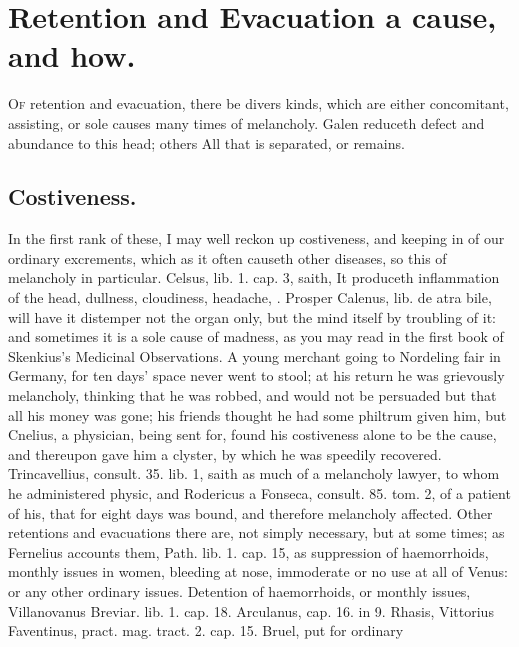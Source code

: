 {%
\section{Retention and Evacuation a cause, and how.}

\lettrine{O}{f} retention and evacuation, there be divers kinds, which are either
concomitant, assisting, or sole causes many times of melancholy. 
Galen reduceth defect and abundance to this head; others All that
is separated, or remains.
\subsection{Costiveness.}
In the first rank of these, I may well reckon up
costiveness, and keeping in of our ordinary excrements, which as it
often causeth other diseases, so this of melancholy in particular.
Celsus, lib. 1. cap. 3, saith, It produceth inflammation of the
head, dullness, cloudiness, headache, \etc{}. Prosper Calenus, lib. de atra
bile, will have it distemper not the organ only, but the mind
itself by troubling of it: and sometimes it is a sole cause of madness,
as you may read in the first book of Skenkius's Medicinal
Observations. A young merchant going to Nordeling fair in Germany, for
ten days' space never went to stool; at his return he was
grievously melancholy, thinking that he was robbed, and would not
be persuaded but that all his money was gone; his friends thought he
had some philtrum given him, but Cnelius, a physician, being sent for,
found his costiveness alone to be the cause, and thereupon gave
him a clyster, by which he was speedily recovered. Trincavellius,
consult. 35. lib. 1, saith as much of a melancholy lawyer, to whom he
administered physic, and Rodericus a Fonseca, consult. 85. tom. 2,
of a patient of his, that for eight days was bound, and therefore
melancholy affected. Other retentions and evacuations there are, not
simply necessary, but at some times; as Fernelius accounts them, Path.
lib. 1. cap. 15, as suppression of haemorrhoids, monthly issues in
women, bleeding at nose, immoderate or no use at all of Venus: or any
other ordinary issues.
Detention of haemorrhoids, or monthly issues, Villanovanus
Breviar. lib. 1. cap. 18. Arculanus, cap. 16. in 9. Rhasis, Vittorius
Faventinus, pract. mag. tract. 2. cap. 15. Bruel, \etc{} put for ordinary
}
